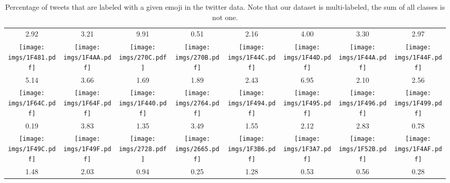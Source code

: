 \documentclass[11pt,a4paper]{article}
\begin{document}
\begin{table}[t]
{\begin{tabular}{cccccccc}
2.92 & 3.21 & 9.91 & 0.51 & 2.16 & 4.00 & 3.30 & 2.97 \\
\texttt{[image: imgs/1F481.pdf]} & \texttt{[image: imgs/1F4AA.pdf]} & \texttt{[image: imgs/270C.pdf]} & \texttt{[image: imgs/270B.pdf]} & \texttt{[image: imgs/1F44C.pdf]} & \texttt{[image: imgs/1F44D.pdf]} & \texttt{[image: imgs/1F44A.pdf]} & \texttt{[image: imgs/1F44F.pdf]} \\
5.14 & 3.66 & 1.69 & 1.89 & 2.43 & 6.95 & 2.10 & 2.56 \\
\texttt{[image: imgs/1F64C.pdf]} & \texttt{[image: imgs/1F64F.pdf]} & \texttt{[image: imgs/1F440.pdf]} & \texttt{[image: imgs/2764.pdf]} & \texttt{[image: imgs/1F494.pdf]} & \texttt{[image: imgs/1F495.pdf]} & \texttt{[image: imgs/1F496.pdf]} & \texttt{[image: imgs/1F499.pdf]} \\
0.19 & 3.83 & 1.35 & 3.49 & 1.55 & 2.12 & 2.83 & 0.78  \\
\texttt{[image: imgs/1F49C.pdf]} & \texttt{[image: imgs/1F49F.pdf]} & \texttt{[image: imgs/2728.pdf]} & \texttt{[image: imgs/2665.pdf]} & \texttt{[image: imgs/1F3B6.pdf]} & \texttt{[image: imgs/1F3A7.pdf]} & \texttt{[image: imgs/1F52B.pdf]} & \texttt{[image: imgs/1F4AF.pdf]} \\    
1.48 & 2.03 & 0.94 & 0.25 & 1.28 & 0.53 & 0.56 & 0.28 \\
\end{tabular}
}
\caption{Percentage of tweets that are labeled with a given emoji in the twitter data. Note that our dataset is multi-labeled, the sum of all classes is not one.}
\label{table:twitter_data}
\end{table}

\begin{table}[t!]
\centering
{}
\caption{Percentage of data samples that are labeled with a given emotion in the IEMOCAP dataset.}
\label{table:iemocap_data}
\end{table}
\end{document}
